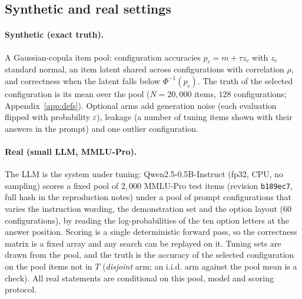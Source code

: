 \subsection{Synthetic and real settings}
\paragraph{Synthetic (exact truth).} A Gaussian-copula item pool: configuration accuracies $p_c=m+\tau z_c$ with $z_c$ standard normal, an item latent shared across configurations with correlation $\rho$, and correctness when the latent falls below $\Phi^{-1}(p_c)$. The truth of the selected configuration is its mean over the pool ($N=20{,}000$ items, $128$ configurations; Appendix~\ref{app:defs}). Optional arms add generation noise (each evaluation flipped with probability $\varepsilon$), leakage (a number of tuning items shown with their answers in the prompt) and one outlier configuration.
\paragraph{Real (small LLM, MMLU-Pro).} The LLM is the system under tuning: Qwen2.5-0.5B-Instruct (fp32, CPU, no sampling) scores a fixed pool of $2{,}000$ MMLU-Pro test items (revision \texttt{b189ec7}, full hash in the reproduction notes) under a pool of prompt configurations that varies the instruction wording, the demonstration set and the option layout ($60$ configurations), by reading the log-probabilities of the ten option letters at the answer position. Scoring is a single deterministic forward pass, so the correctness matrix is a fixed array and any search can be replayed on it. Tuning sets are drawn from the pool, and the truth is the accuracy of the selected configuration on the pool items not in $T$ (\emph{disjoint} arm; an i.i.d. arm against the pool mean is a check). All real statements are conditional on this pool, model and scoring protocol.
